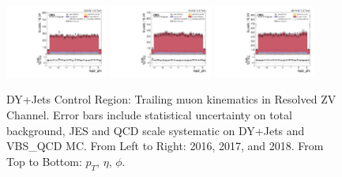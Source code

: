 \begin{figure}[!ht]
  \includegraphics[width=0.30\textwidth]{analysis_plots/2016_zjj/cr_vjets_m/lep2_phi.pdf}
  \includegraphics[width=0.30\textwidth]{analysis_plots/2017_zjj/cr_vjets_m/lep2_phi.pdf}
  \includegraphics[width=0.30\textwidth]{analysis_plots/2018_zjj/cr_vjets_m/lep2_phi.pdf} \\
  \caption[DY+Jets Control Region: Trailing muon kinematics in Resolved ZV Channel]%
  {DY+Jets Control Region: Trailing muon kinematics in Resolved ZV Channel.
    Error bars include statistical uncertainty on total background,
    JES and QCD scale systematic on DY+Jets and VBS\_QCD MC\@. From Left to Right: 2016,
    2017, and 2018. From Top to Bottom: \( p_T \), \( \eta \), \( \phi \).}%
  \label{fig:zjj-cr-vjets-m-lep2-pt-eta-phi}
\end{figure}

